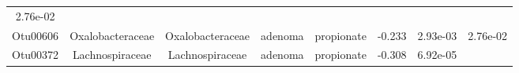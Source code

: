 \documentclass[11pt,]{article}
\begin{document}
\begin{longtable}[]{@{}cccccccc@{}}
\begin{minipage}[t]{0.08\columnwidth}
2.76e-02\strut
\end{minipage}\tabularnewline
\begin{minipage}[t]{0.08\columnwidth}\centering\strut
Otu00606\strut
\end{minipage} & \begin{minipage}[t]{0.15\columnwidth}\centering\strut
Oxalobacteraceae\strut
\end{minipage} & \begin{minipage}[t]{0.15\columnwidth}\centering\strut
Oxalobacteraceae\strut
\end{minipage} & \begin{minipage}[t]{0.08\columnwidth}\centering\strut
adenoma\strut
\end{minipage} & \begin{minipage}[t]{0.09\columnwidth}\centering\strut
propionate\strut
\end{minipage} & \begin{minipage}[t]{0.07\columnwidth}\centering\strut
-0.233\strut
\end{minipage} & \begin{minipage}[t]{0.08\columnwidth}\centering\strut
2.93e-03\strut
\end{minipage} & \begin{minipage}[t]{0.08\columnwidth}\centering\strut
2.76e-02\strut
\end{minipage}\tabularnewline
\begin{minipage}[t]{0.08\columnwidth}\centering\strut
Otu00372\strut
\end{minipage} & \begin{minipage}[t]{0.15\columnwidth}\centering\strut
Lachnospiraceae\strut
\end{minipage} & \begin{minipage}[t]{0.15\columnwidth}\centering\strut
Lachnospiraceae\strut
\end{minipage} & \begin{minipage}[t]{0.08\columnwidth}\centering\strut
adenoma\strut
\end{minipage} & \begin{minipage}[t]{0.09\columnwidth}\centering\strut
propionate\strut
\end{minipage} & \begin{minipage}[t]{0.07\columnwidth}\centering\strut
-0.308\strut
\end{minipage} & \begin{minipage}[t]{0.08\columnwidth}\centering\strut
6.92e-05\strut
\end{minipage} & \begin{minipage}[t]{0.08\columnwidth}\centering\strut

\end{minipage}
\end{longtable}
\end{document}
